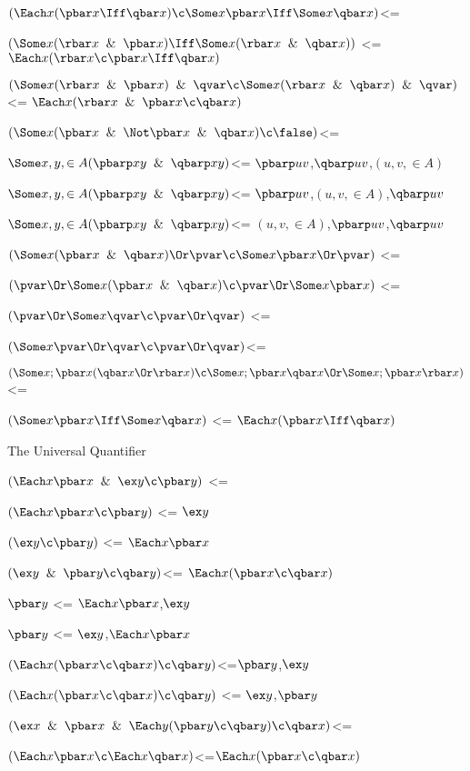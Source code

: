 $(\Each x(\pbar x \Iff \qbar x) \c \Some x\pbar x \Iff \Some x\qbar x)$<=

$(\Some x (\rbar x \And \pbar x)\Iff \Some x (\rbar x \And \qbar x))$ <=$\Each x(\rbar x \c \pbar x \Iff \qbar x)$

$(\Some x (\rbar x \And \pbar x) \And \qvar \c \Some x (\rbar x \And \qbar x) \And \qvar)$ <= $\Each x(\rbar x \And \pbar x \c \qbar x)$

$(\Some x (\pbar x \And \Not \pbar x \And \qbar x) \c \false)$<=

$\Some x,y, \in A (\pbarp xy \And \qbarp xy)$<= $\pbarp uv$,$\qbarp uv$,$(u,v,\in A)$

$\Some x,y, \in A (\pbarp xy \And \qbarp xy)$<= $\pbarp uv$,$(u,v,\in A)$,$\qbarp uv$

$\Some x,y, \in A (\pbarp xy \And \qbarp xy)$<= $(u,v,\in A)$,$\pbarp uv$,$\qbarp uv$

$(\Some x (\pbar x \And \qbar x) \Or \pvar \c \Some x \pbar x \Or \pvar)$ <=

$(\pvar \Or \Some x (\pbar x \And \qbar x) \c \pvar \Or \Some x \pbar x )$ <=

$(\pvar \Or \Some x \qvar \c \pvar \Or \qvar)$ <=

$(\Some x \pvar \Or \qvar \c \pvar \Or \qvar)$<=

$(\Some x ; \pbar x (\qbar x \Or \rbar x)\c \Some x;\pbar x \qbar x \Or \Some x ;\pbar x \rbar x)$<=

$(\Some x \pbar x \Iff \Some x\qbar x)$ <= $\Each x (\pbar x \Iff \qbar x)$  
\lineb

The Universal Quantifier
\lineb

$(\Each x \pbar x \And \ex y \c \pbar y)$ <=

$(\Each x \pbar x \c \pbar y)$ <= $\ex y$

$(\ex y \c \pbar y)$ <= $\Each x \pbar x$

$(\ex y \And \pbar y \c \qbar y)$<= $\Each x (\pbar x \c \qbar x)$

$\pbar y$ <= $\Each x \pbar x$,$\ex y$

$\pbar y$ <= $\ex y$,$\Each x \pbar x$

$(\Each x (\pbar x \c \qbar x) \c \qbar y)$<=$\pbar y$,$\ex y$

$(\Each x (\pbar x \c \qbar x) \c \qbar y)$ <= $\ex y$,$\pbar y$

$(\ex x \And \pbar x \And \Each y(\pbar y \c \qbar y) \c \qbar x)$<=

$(\Each x \pbar x \c \Each x \qbar x)$<=$\Each x(\pbar x \c \qbar x)$

